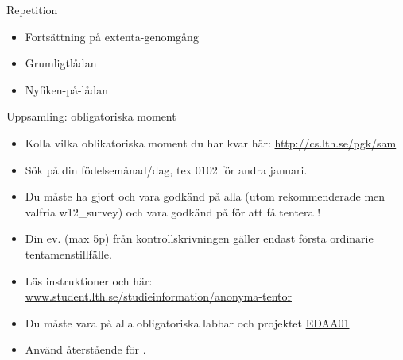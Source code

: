 

\ifkompendium\else


\begin{Slide}{Repetition}
  \begin{itemize}
    \item Fortsättning på extenta-genomgång
    \item Grumligtlådan
    \item Nyfiken-på-lådan
  \end{itemize}
\end{Slide}


\begin{Slide}{Uppsamling: obligatoriska moment}\SlideFontSmall
\begin{itemize}
\item Kolla vilka oblikatoriska moment du har kvar här:
\url{http://cs.lth.se/pgk/sam}
\item Sök på din födelsemånad/dag, tex 0102 för andra januari.
\item Du måste ha gjort  och vara godkänd på alla  (utom rekommenderade men valfria w12\_survey) och vara godkänd på  för att få tentera !
\item Din ev.  (max 5p) från kontrollskrivningen gäller endast första ordinarie tentamenstillfälle.
\item Läs  instruktioner  och  här: \\
\href{http://www.student.lth.se/studieinformation/anonyma-tentor/}{www.student.lth.se/studieinformation/anonyma-tentor}
\item Du måste vara  på alla obligatoriska labbar och projektet  \href{http://cs.lth.se/edaa01vt}{EDAA01}
\item Använd återstående  för .
\end{itemize}
\end{Slide}

